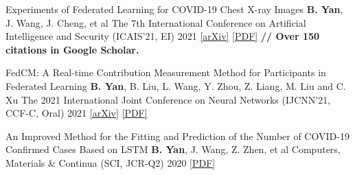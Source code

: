 \begin{cvpublications}

\cvpublication
{Experiments of Federated Learning for COVID-19 Chest X-ray Images} %
{\textbf{B. Yan}, J. Wang, J. Cheng, et al} %
{The 7th International Conference on Artificial Intelligence and Security (ICAIS'21, EI)} %
{2021} %
{
	\href{https://arxiv.org/abs/2007.05592}{[arXiv]} \href{https://link.springer.com/chapter/10.1007/978-3-030-78618-2_4}{[PDF]}
	\textbf{ // Over 150 citations in Google Scholar.} 
} %


\cvpublication
{FedCM: A Real-time Contribution Measurement Method for Participants in Federated Learning} %
{\textbf{B. Yan}, B. Liu, L. Wang, Y. Zhou, Z. Liang, M. Liu and C. Xu} %
{The 2021 International Joint Conference on Neural Networks (IJCNN'21, CCF-C, Oral)} %
{2021} %
{\href{https://arxiv.org/abs/2009.03510}{[arXiv]} \href{https://ieeexplore.ieee.org/abstract/document/9534451/}{[PDF]}} %


\cvpublication
{An Improved Method for the Fitting and Prediction of the Number of COVID-19 Confirmed Cases Based on LSTM} %
{\textbf{B. Yan}, J. Wang, Z. Zhen, et al} %
{Computers, Materials \& Continua (SCI, JCR-Q2)} %
{2020} %
{\href{https://www.techscience.com/cmc/v64n3/39440/pdf}{[PDF]}} %



\end{cvpublications}






